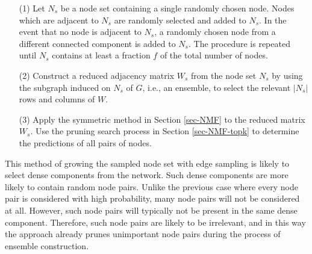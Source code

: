 \vspace{-1ex}
\begin{enumerate}


\item[(1)]  Let $N_s$ be a node set containing a single randomly chosen
node. Nodes which are adjacent to $N_s$ are randomly selected and
added to $N_s$. In the event that no node is adjacent to $N_s$, a
randomly chosen node from a different connected component is added
to $N_s$. The procedure is repeated until $N_s$ contains at least a
fraction $f$ of the total number of nodes.
\item[(2)]  Construct a reduced
adjacency matrix $W_s$ from the node set $N_s$ by using the subgraph
induced on $N_s$ of $G$, i.e., an ensemble, to select the relevant $|N_s|$ rows and columns of $W$.
\item[(3)] Apply the symmetric \NMF method in Section \ref{sec-NMF}
to the reduced matrix $W_s$.  Use the pruning search
process in Section \ref{sec-NMF-topk} to determine the predictions of all pairs of nodes.
\end{enumerate}
\vspace{-1ex}


This method of growing the sampled node set with edge sampling is
likely to select dense components from the network. Such dense
components are more likely to contain random node pairs. Unlike the
previous case where every node pair is considered with high
probability, many node pairs will not be considered at all. However,
such node pairs will typically not be present in the same dense
component. Therefore, such node pairs are likely to be irrelevant,
and in this way the approach already prunes unimportant node pairs
during the process of ensemble construction.



